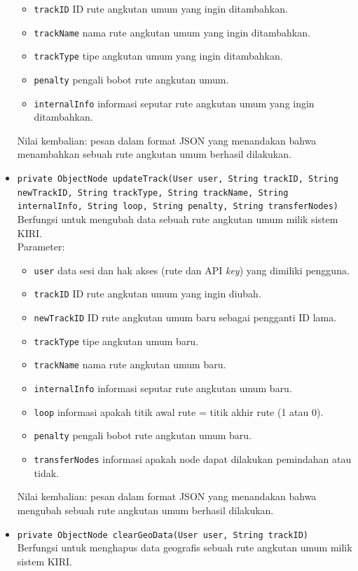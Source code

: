 \begin{itemize}
\begin{itemize}
		\item \texttt{trackID} ID rute angkutan umum yang ingin ditambahkan.
		\item \texttt{trackName} nama rute angkutan umum yang ingin ditambahkan.
		\item \texttt{trackType} tipe angkutan umum yang ingin ditambahkan.
		\item \texttt{penalty} pengali bobot rute angkutan umum.
		\item \texttt{internalInfo} informasi seputar rute angkutan umum yang ingin ditambahkan.
	\end{itemize}
	Nilai kembalian: pesan dalam format JSON yang menandakan bahwa menambahkan sebuah rute angkutan umum berhasil dilakukan.
	\item \texttt{private ObjectNode updateTrack(User user, String trackID, String newTrackID, String trackType, String trackName, String internalInfo, String loop, String penalty, String transferNodes)}\\
	Berfungsi untuk mengubah data sebuah rute angkutan umum milik sistem KIRI.\\
	Parameter:
	\begin{itemize}
		\item \texttt{user} data sesi dan hak akses (rute dan API \textit{key}) yang dimiliki pengguna.
		\item \texttt{trackID} ID rute angkutan umum yang ingin diubah.
		\item \texttt{newTrackID} ID rute angkutan umum baru sebagai pengganti ID lama.
		\item \texttt{trackType} tipe angkutan umum baru.
		\item \texttt{trackName} nama rute angkutan umum baru.
		\item \texttt{internalInfo} informasi seputar rute angkutan umum baru.
		\item \texttt{loop} informasi apakah titik awal rute = titik akhir rute (1 atau 0).
		\item \texttt{penalty} pengali bobot rute angkutan umum baru.
		\item \texttt{transferNodes} informasi apakah node dapat dilakukan pemindahan atau tidak.
	\end{itemize}
	Nilai kembalian: pesan dalam format JSON yang menandakan bahwa mengubah sebuah rute angkutan umum berhasil dilakukan.
	\item \texttt{private ObjectNode clearGeoData(User user, String trackID)}\\
	Berfungsi untuk menghapus data geografis sebuah rute angkutan umum milik sistem KIRI.\\

\end{itemize}
